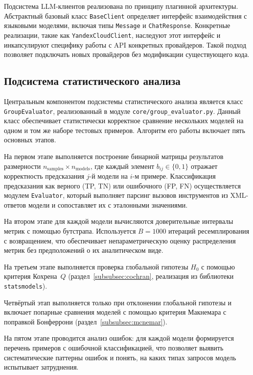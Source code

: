 Подсистема LLM-клиентов реализована по принципу плагинной архитектуры. Абстрактный базовый класс \texttt{Base\-Client} определяет интерфейс взаимодействия с языковыми моделями, включая типы \texttt{Message} и \texttt{Chat\-Response}. Конкретные реализации, такие как \texttt{Yandex\-Cloud\-Client}, наследуют этот интерфейс и инкапсулируют специфику работы с API конкретных провайдеров. Такой подход позволяет подключать новых провайдеров без модификации существующего кода.

\subsection{Подсистема статистического анализа}

Центральным компонентом подсистемы статистического анализа является класс \texttt{Group\-Evaluator}, реализованный в модуле \texttt{core/\allowbreak group\_evaluator.py}. Данный класс обеспечивает статистически корректное сравнение нескольких моделей на одном и том же наборе тестовых примеров. Алгоритм его работы включает пять основных этапов.

На первом этапе выполняется построение бинарной матрицы результатов размерности $n_{\text{samples}} \times n_{\text{models}}$, где каждый элемент $b_{ij} \in \{0, 1\}$ отражает корректность предсказания $j$-й модели на $i$-м примере. Классификация предсказания как верного (TP, TN) или ошибочного (FP, FN) осуществляется модулем \texttt{Evaluator}, который выполняет парсинг вызовов инструментов из XML-ответов модели и сопоставляет их с эталонными значениями.

На втором этапе для каждой модели вычисляются доверительные интервалы метрик с помощью бутстрапа. Используется $B = 1000$ итераций ресемплирования с возвращением, что обеспечивает непараметрическую оценку распределения метрик без предположений о их аналитическом виде.

На третьем этапе выполняется проверка глобальной гипотезы $H_0$ с помощью критерия Кохрена~$Q$ (раздел~\ref{subsubsec:cochran}, реализация из библиотеки \texttt{statsmodels}).

Четвёртый этап выполняется только при отклонении глобальной гипотезы и включает попарные сравнения моделей с помощью критерия Макнемара с поправкой Бонферрони (раздел~\ref{subsubsec:mcnemar}).

На пятом этапе проводится анализ ошибок: для каждой модели формируется перечень примеров с ошибочной классификацией, что позволяет выявить систематические паттерны ошибок и понять, на каких типах запросов модель испытывает затруднения.

